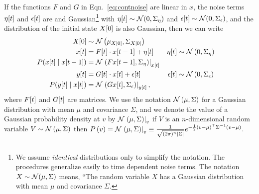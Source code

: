 If the functions $F$ and $G$ in Eqn.~\eqref{eq:contnoise} are linear
in $x$, the noise terms ${\eta}{[t]}$ and ${\epsilon}{[t]}$ are \iid
and Gaussian\footnote{We assume \emph{identical} distributions only to
  simplify the notation.  The procedures generalize easily to time
  dependent noise terms.  The notation $X\sim{\mathcal{N}}(\mu,\Sigma)$
  means, ``The random variable $X$ has a Gaussian distribution with
  mean $\mu$ and covariance $\Sigma$.} with ${\eta}{[t]} \sim
{\mathcal{N}}(0,\Sigma_\eta)$ and ${\epsilon}{[t]} \sim
{\mathcal{N}}(0,\Sigma_\epsilon)$, and the distribution of the initial state
${X}{[0]}$ is also Gaussian, then we can write
\begin{subequations}
  \label{eq:LinearG}
  \begin{align}
  {X}{[0]} & \sim {\mathcal{N}}\left(\mu_{{X}{[0]}},\Sigma_{{X}{[0]}}
  \right)\\
  {x}{[t]} &= {F}{[t]} \cdot {x}{[t-1]} + {\eta}{[t]} &
                                                            {\eta}{[t]} &\sim {\mathcal{N}}\left( 0, \Sigma_\eta \right) \\
    P({x}{[t]}\mid {x}{[t-1]}) &=
                                    {\mathcal{N}}\left.\left(F{x}{[t-1]},\Sigma_\eta\right)\right|_{{x}{[t]}} \\
  {y}{[t]} &= {G}{[t]} \cdot {x}{[t]} + {\epsilon}{[t]} &
  {\epsilon}{[t]} &\sim {\mathcal{N}}\left( 0, \Sigma_\epsilon \right) \\
    P({y}{[t]}\mid {x}{[t]}) &=
                                    {\mathcal{N}}\left.\left(G{x}{[t]},\Sigma_\epsilon\right)\right|_{{y}{[t]}},
  \end{align}
\end{subequations}
where ${F}{[t]}$ and ${G}{[t]}$ are matrices.  We use the notation
${\mathcal{N}}\left( \mu, \Sigma \right)$ for a Gaussian distribution with
mean $\mu$ and covariance $\Sigma$, and we denote the value of a
Gaussian probability density at $v$ by ${\mathcal{N}}\left.\left(\mu,\Sigma\right)\right|_{v}$ \ie
if $V$ is an $n$-dimensional random variable $V \sim {\mathcal{N}}\left( \mu,
  \Sigma \right)$ then $ P\left(v \right) = {\mathcal{N}}\left.\left(\mu,\Sigma\right)\right|_{v}
\equiv \frac{1}{\sqrt{(2\pi)^n \left|\Sigma\right|}} e^{-\frac{1}{2}
  (v-\mu)^\top \Sigma^{-1} (v-\mu)}$.

